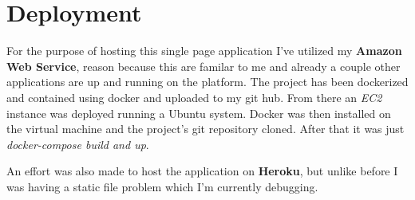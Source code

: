 \documentclass[11pt]{article}
\begin{document}
\section{Deployment}
For the purpose of hosting this single page application I've utilized my \textbf{Amazon Web Service}, reason because this are familar to me and already a couple other applications are up and running on the platform. 
The project has been dockerized and contained using docker and uploaded to my git hub. 
From there an \textit{EC2} instance was deployed running a Ubuntu system. 
Docker was then installed on the virtual machine and the project's git repository cloned. 
After that it was just \textit{docker-compose build and up}. \par
An effort was also made to host the application on \textbf{Heroku}, but unlike before I was having a static file problem which I'm currently debugging.
\end{document}
